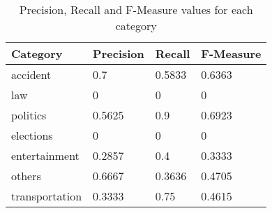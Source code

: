 \begin{table}
\begin{tabular}{ | p{3.3cm} | p{1.5cm} | p{1.5cm} | p{1.5cm} |}
\hline
\textbf{Category} & \textbf{Precision} & \textbf{Recall} & \textbf{F-Measure}  \\
\hline
accident & 0.7 & 0.5833 & 0.6363 \\
\hline
law & 0 & 0 & 0  \\
\hline
politics & 0.5625 & 0.9 & 0.6923   \\
\hline
elections & 0 & 0 & 0 \\
\hline
entertainment & 0.2857 & 0.4 & 0.3333 \\
\hline
others & 0.6667 & 0.3636 & 0.4705 \\
\hline
transportation & 0.3333 & 0.75 & 0.4615 \\
\hline
\end{tabular}
\caption{Precision, Recall and F-Measure values for each category}
\label{table:q3-2}
\end{table}
